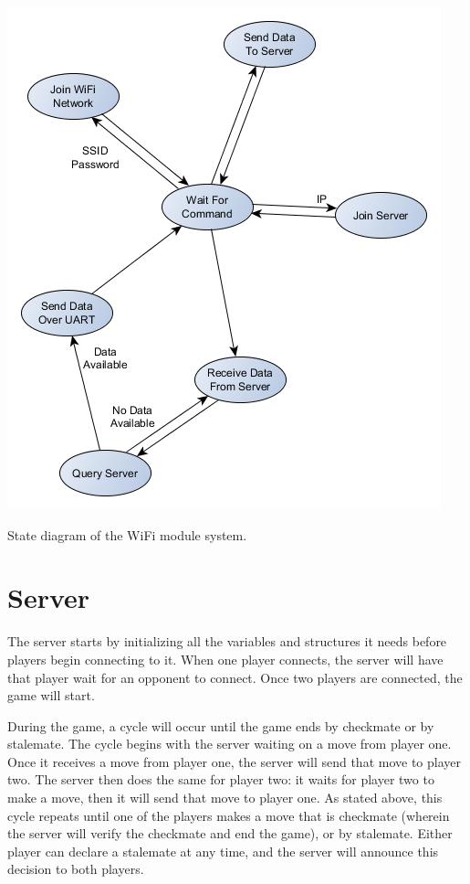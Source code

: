 \documentclass[12pt]{article}
\begin{document}
\centerline{\includegraphics[scale=.5]{WiFi_Module_State}}

\begin{center}
State diagram of the WiFi module system.
\end{center}

\vspace*{5mm}

\section*{Server}
\indent

The server starts by initializing all the variables and structures it needs before players begin connecting to it. When one player connects, the server will have that player wait for an opponent to connect. Once two players are connected, the game will start.  

\indent  

During the game, a cycle will occur until the game ends by checkmate or by stalemate. The cycle begins with the server waiting on a move from player one. Once it receives a move from player one, the server will send that move to player two. The server then does the same for player two: it waits for player two to make a move, then it will send that move to player one. As stated above, this cycle repeats until one of the players makes a move that is checkmate (wherein the server will verify the checkmate and end the game), or by stalemate. Either player can declare a stalemate at any time, and the server will announce this decision to both players.  
\end{document}
